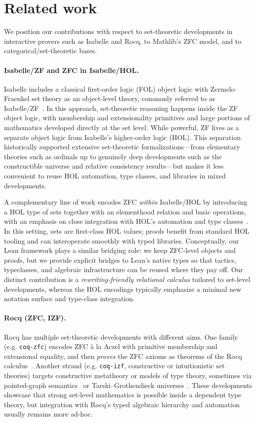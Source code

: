 \section{Related work}
\label{sec:zflean-related}
We position our contributions with respect to set-theoretic developments in interactive provers such as Isabelle and Rocq, to Mathlib's ZFC model, and to categorical/set-theoretic bases.

\paragraph*{Isabelle/ZF and ZFC in Isabelle/HOL.}
Isabelle includes a classical first-order logic (FOL) object logic with Zermelo–Fraenkel set theory as an object-level theory, commonly referred to as Isabelle/ZF~\cite{paulson-zf}.
In this approach, set-theoretic reasoning happens inside the ZF object logic, with membership and extensionality primitives and large portions of mathematics developed directly at the set level.
While powerful, ZF lives as a separate object logic from Isabelle's higher-order logic (HOL).
This separation historically supported extensive set-theoretic formalizations---from elementary theories such as ordinals up to genuinely deep developments such as the constructible universe and relative consistency results---but makes it less convenient to reuse HOL automation, type classes, and libraries in mixed developments.

A complementary line of work encodes ZFC \emph{within} Isabelle/HOL by introducing a HOL type of sets together with an elementhood relation and basic operations, with an emphasis on close integration with HOL's automation and type classes~\cite{paulson-zf-hol}.
In this setting, sets are first-class HOL values; proofs benefit from standard HOL tooling and can interoperate smoothly with typed libraries.
Conceptually, our Lean framework plays a similar bridging role: we keep ZFC-level objects and proofs, but we provide explicit bridges to Lean's native types so that tactics, typeclasses, and algebraic infrastructure can be reused where they pay off.
Our distinct contribution is a \emph{rewriting-friendly relational calculus} tailored to set-level developments, whereas the HOL encodings typically emphasize a minimal new notation surface and type-class integration.

\paragraph*{Rocq (ZFC, IZF).}
Rocq has multiple set-theoretic developments with different aims. One family (e.g. \texttt{coq-zfc}) encodes ZFC à la Aczel with primitive membership and extensional equality, and then \emph{proves} the ZFC axioms as theorems of the Rocq calculus~\cite{aczel-set-theory}.
Another strand (e.g. \texttt{coq-izf}, constructive or intuitionistic set theories) targets constructive metatheory or models of type theory, sometimes via pointed-graph semantics~\cite{miquel-pts-set-theory} or Tarski–Grothendieck universes~\cite{barras-set-theory}.
These developments showcase that strong set-level mathematics is possible inside a dependent type theory, but integration with Rocq's typed algebraic hierarchy and automation usually remains more ad-hoc.

